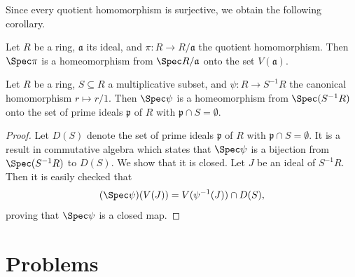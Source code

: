 Since every quotient homomorphism is surjective, we obtain the following corollary.

\begin{corollary}
	Let $R$ be a ring, $\mathfrak{a}$ its ideal, and $\pi \colon R \to R/\mathfrak{a}$ the quotient homomorphism. Then $\Spec \pi$ is a homeomorphism from $\Spec R/\mathfrak{a}$ onto the set $V(\mathfrak{a})$.
\end{corollary}

\begin{proposition}\label{chap2:localisations-isomorphic-to-spec}
	Let $R$ be a ring, $S \subseteq R$ a multiplicative subset, and $\psi \colon R \to S^{-1}R$ the canonical homomorphism $r \mapsto r/1$. Then $\Spec \psi$ is a homeomorphism from $\Spec(S^{-1}R)$ onto the set of prime ideals $\mathfrak{p}$ of $R$ with $\mathfrak{p} \cap S = \emptyset$.
\end{proposition}

\begin{proof}
	Let $D(S)$ denote the set of prime ideals $\mathfrak{p}$ of $R$ with $\mathfrak{p} \cap S = \emptyset$. It is a result in commutative algebra which states that $\Spec \psi$ is a bijection from $\Spec(S^{-1}R)$ to $D(S)$. We show that it is closed. Let $J$ be an ideal of $S^{-1}R$. Then it is easily checked that
	\begin{equation*}
		(\Spec \psi)(V(J)) = V(\psi^{-1}(J)) \cap D(S),
	\end{equation*}
	proving that $\Spec \psi$ is a closed map.
\end{proof}

\section{Problems}

